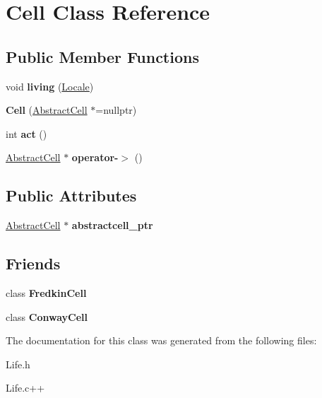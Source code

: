 \hypertarget{classCell}{\section{Cell Class Reference}
\label{classCell}
}
\subsection*{Public Member Functions}
\begin{DoxyCompactItemize}
\item 
\hypertarget{classCell_a4f4c57dd913d6cb58287d4193eefa69f}{void {\bfseries living} (\hyperlink{structLocale}{Locale})}\label{classCell_a4f4c57dd913d6cb58287d4193eefa69f}

\item 
\hypertarget{classCell_a11a25348c84b39292c8f10923b3427d1}{{\bfseries Cell} (\hyperlink{classAbstractCell}{Abstract\-Cell} $\ast$=nullptr)}\label{classCell_a11a25348c84b39292c8f10923b3427d1}

\item 
\hypertarget{classCell_a1bfc6791f9916c0436d1f6242f6bb213}{int {\bfseries act} ()}\label{classCell_a1bfc6791f9916c0436d1f6242f6bb213}

\item 
\hypertarget{classCell_a532b26bf445ab573b1bc00b876c9ca42}{\hyperlink{classAbstractCell}{Abstract\-Cell} $\ast$ {\bfseries operator-\/$>$} ()}\label{classCell_a532b26bf445ab573b1bc00b876c9ca42}

\end{DoxyCompactItemize}
\subsection*{Public Attributes}
\begin{DoxyCompactItemize}
\item 
\hypertarget{classCell_a370fa2c4f2f8a06a5886a72f34ba492b}{\hyperlink{classAbstractCell}{Abstract\-Cell} $\ast$ {\bfseries abstractcell\-\_\-ptr}}\label{classCell_a370fa2c4f2f8a06a5886a72f34ba492b}

\end{DoxyCompactItemize}
\subsection*{Friends}
\begin{DoxyCompactItemize}
\item 
\hypertarget{classCell_af9ef66cb5aeb8b53ce639ba912ca5dbf}{class {\bfseries Fredkin\-Cell}}\label{classCell_af9ef66cb5aeb8b53ce639ba912ca5dbf}

\item 
\hypertarget{classCell_a3d40ad4ebe6b5876817523e88934a66b}{class {\bfseries Conway\-Cell}}\label{classCell_a3d40ad4ebe6b5876817523e88934a66b}

\end{DoxyCompactItemize}


The documentation for this class was generated from the following files\-:\begin{DoxyCompactItemize}
\item 
Life.\-h\item 
Life.\-c++\end{DoxyCompactItemize}
